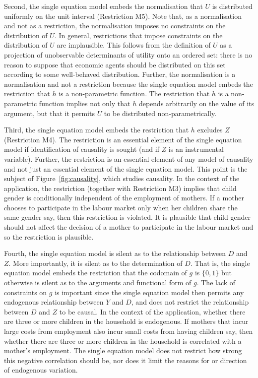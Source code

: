 \documentclass[12pt,a4paper,twoside]{article}
\numberwithin{equation}{section}
\begin{document}
Second, the single equation model embeds the normalisation that $U$ is distributed uniformly on the unit interval (Restriction M5). Note that, as a normalisation and not as a restriction, the normalisation imposes no constraints on the distribution of $U$. In general, restrictions that impose constraints on the distribution of $U$ are implausible. This follows from the definition of $U$ as a projection of unobservable determinants of utility onto an ordered set: there is no reason to suppose that economic agents should be distributed on this set according to some well-behaved distribution. Further, the normalisation is a normalisation and not a restriction because the single equation model embeds the restriction that $h$ is a non-parametric function. The restriction that $h$ is a non-parametric function implies not only that $h$ depends arbitrarily on the value of its argument, but that it permits $U$ to be distributed non-parametrically. 

Third, the single equation model embeds the restriction that $h$ excludes $Z$ (Restriction M4). The restriction is an essential element of the single equation model if identification of causality is sought (and if $Z$ is an instrumental variable). Further, the restriction is an essential element of any model of causality and not just an essential element of the single equation model. This point is the subject of Figure~\ref{fig:causality}, which studies causality. In the context of the application, the restriction (together with Restriction M3) implies that child gender is conditionally independent of the employment of mothers. If a mother chooses to participate in the labour market only when her children share the same gender say, then this restriction is violated. It is plausible that child gender should not affect the decision of a mother to participate in the labour market and so the restriction is plausible.     

Fourth, the single equation model is silent as to the relationship between $D$ and $Z$. More importantly, it is silent as to the determination of $D$. That is, the single equation model embeds the restriction that the codomain of $g$ is $\lbrace 0,1\rbrace$ but otherwise is silent as to the arguments and functional form of $g$. The lack of constraints on $g$ is important since the single equation model then permits any endogenous relationship between $Y$ and $D$, and does not restrict the relationship between $D$ and $Z$ to be causal. In the context of the application, whether there are three or more children in the household is endogenous. If mothers that incur large costs from employment also incur small costs from having children say, then whether there are three or more children in the household is correlated with a mother's employment. The single equation model does not restrict how strong this negative correlation should be, nor does it limit the reasons for or direction of endogenous variation. 
\end{document}
